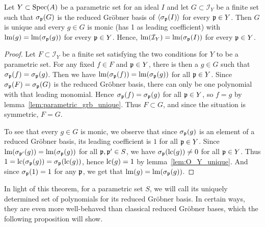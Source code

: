 \begin{theorem}\label{thm:red_grb_uniq_and_monic_and_stable}
  Let $Y \subset \operatorname{Spec}(A)$ be a parametric set for an ideal $I$ and let $G \subset \mathcal I_{Y}$ be a finite set such that $\sigma_{\mathfrak p}(G)$ is the reduced Gröbner basis of $\langle \sigma_{\mathfrak p}(I) \rangle$ for every $\mathfrak p \in Y$. Then $G$ is unique and every $g \in G$ is monic (has 1 as leading coefficient) with $\operatorname{lm}(g) = \operatorname{lm}(\sigma_{\mathfrak p}(g))$ for every $\mathfrak p \in Y$. Hence, $\operatorname{lm}(\mathcal I_{Y}) = \operatorname{lm}(\sigma_{\mathfrak p}(I))$ for every $\mathfrak p \in Y$.
\end{theorem}
\begin{proof}
  Let $F \subset \mathcal I_{Y}$ be a finite set satisfying the two conditions for $Y$ to be a parametric set. For any fixed $f \in F$ and $\mathfrak p \in Y$, there is then a $g \in G$ such that $\sigma_{\mathfrak p}(f) = \sigma_{\mathfrak p}(g)$. Then we have $\operatorname{lm}(\sigma_{\mathfrak p}(f)) = \operatorname{lm}(\sigma_{\mathfrak p}(g))$ for all $\mathfrak p \in Y$. Since $\sigma_{\mathfrak p}(F) = \sigma_{\mathfrak p}(G)$ is the reduced Gröbner basis, there can only be one polynomial with that leading monomial. Hence $\sigma_{\mathfrak p}(f) = \sigma_{\mathfrak p}(g)$ for all $\mathfrak p \in Y$, so $f = g$ by lemma~\ref{lem:parametric_grb_unique}. Thus $F \subset G$, and since the situation is symmetric, $F = G$.

  To see that every $g \in G$ is monic, we observe that since $\sigma_{\mathfrak p}(g)$ is an element of a reduced Gröbner basis, its leading coefficient is $1$ for all $\mathfrak p \in Y$. Since $\operatorname{lm}(\sigma_{\mathfrak p'}(g)) = \operatorname{lm}(\sigma_{\mathfrak p}(g))$ for all $\mathfrak p, \mathfrak p' \in S$, we have $\sigma_{\mathfrak p}(\operatorname{lc}(g)) \neq 0$ for all $\mathfrak p \in Y$. Thus $1 = \operatorname{lc}(\sigma_{\mathfrak p}(g)) = \sigma_{\mathfrak p}(\operatorname{lc}(g))$, hence $\operatorname{lc}(g) = 1$ by lemma~\ref{lem:O_Y_unique}. And since $\sigma_{\mathfrak p}(1) = 1$ for any $\mathfrak p$, we get that $\operatorname{lm}(g) = \operatorname{lm}(\sigma_{\mathfrak p}(g))$.
\end{proof}

In light of this theorem, for a parametric set $S$, we will call its uniquely determined set of polynomials for its reduced Gröbner basis. In certain ways, they are even more well-behaved than classical reduced Gröbner bases, which the following proposition will show.

